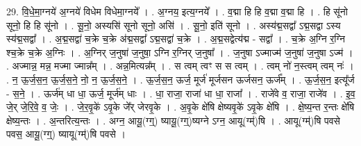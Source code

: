 \documentclass[17pt]{extarticle}
\begin{document}
29. वि॒धे॒मा॒ग्नये॑ अ॒ग्नये॑ विधेम विधेमा॒ग्नये᳚ । . अ॒ग्नय॒ इत्य॒ग्नये᳚ । . व॒द्मा हि हि व॒द्मा व॒द्मा हि । . हि सू॑नो सूनो॒ हि हि सू॑नो । . सू॒नो॒ अस्यसि॑ सूनो सूनो॒ असि॑ । . सू॒नो॒ इति॑ सूनो । . अस्य॑द्म॒सद्वा᳚ ऽद्म॒सद्वा ऽस्य स्य॑द्म॒सद्वा᳚ । . अ॒द्म॒सद्वा॑ च॒क्रे च॒क्रे अ॑द्म॒सद्वा᳚ ऽद्म॒सद्वा॑ च॒क्रे । . अ॒द्म॒सद्वेत्य॑द्म - सद्वा᳚ । . च॒क्रे अ॒ग्नि र॒ग्नि श्च॒क्रे च॒क्रे अ॒ग्निः । . अ॒ग्निर् ज॒नुषा॑ ज॒नुषा॒ ऽग्नि र॒ग्निर् ज॒नुषा᳚ । . ज॒नुषा ऽज्माज्म॑ ज॒नुषा॑ ज॒नुषा ऽज्म॑ । . अज्मान्न॒ मन्न॒ मज्मा ज्मान्न᳚म् । . अन्न॒मित्यन्न᳚म् । . स त्वम् त्वꣳ स स त्वम् । . त्वम् नो॑ न॒स्त्वम् त्वम् नः॑ । . न॒ ऊ॒र्ज॒स॒न॒ ऊ॒र्ज॒स॒ने॒ नो॒ न॒ ऊ॒र्ज॒स॒ने॒ । . ऊ॒र्ज॒स॒न॒ ऊर्ज॒ मूर्ज॑ मूर्जसन ऊर्जसन॒ ऊर्ज᳚म् । . ऊ॒र्ज॒स॒न॒ इत्यू᳚र्ज - स॒ने॒ । . ऊर्ज॑म् धा धा॒ ऊर्ज॒ मूर्ज॑म् धाः । . धा॒ राजा॒ राजा॑ धा धा॒ राजा᳚ । . राजे॑वे व॒ राजा॒ राजे॑व । . इ॒व॒ जे॒र् जे॒रि॒वे॒ व॒ जेः॒ । . जे॒र॒वृ॒के॑ ऽवृ॒के जे᳚र् जेरवृ॒के । . अ॒वृ॒के क्षे॑षि क्षेष्यवृ॒के॑ ऽवृ॒के क्षे॑षि । . क्षे॒ष्य॒न्त र॒न्तः क्षे॑षि क्षेष्य॒न्तः । . अ॒न्तरित्य॒न्तः । . अग्न॒ आयू॒(ग्ग्॒) ष्यायू॒(ग्ग्॒)ष्यग्ने ऽग्न॒ आयू(ग्म्॑)षि । . आयू(ग्म्॑)षि पवसे पवस॒ आयू॒(ग्ग्॒) ष्यायू(ग्म्॑)षि पवसे । \newline
\end{document}
